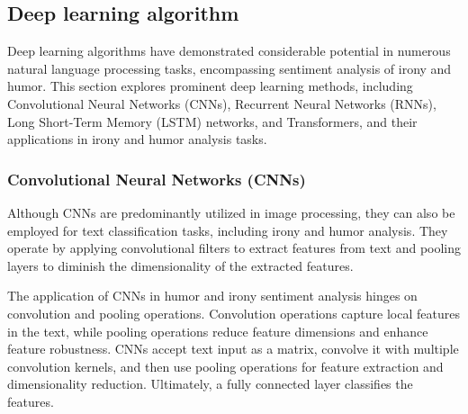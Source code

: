 \documentclass[a4paper]{article}
\begin{document}
\subsection{Deep learning algorithm}

Deep learning algorithms have demonstrated considerable potential in numerous natural language processing tasks, encompassing sentiment analysis of irony and humor. This section explores prominent deep learning methods, including Convolutional Neural Networks (CNNs), Recurrent Neural Networks (RNNs), Long Short-Term Memory (LSTM) networks, and Transformers, and their applications in irony and humor analysis tasks.

\subsubsection{Convolutional Neural Networks (CNNs)}

Although CNNs are predominantly utilized in image processing, they can also be employed for text classification tasks, including irony and humor analysis. They operate by applying convolutional filters to extract features from text and pooling layers to diminish the dimensionality of the extracted features.

The application of CNNs in humor and irony sentiment analysis hinges on convolution and pooling operations. Convolution operations capture local features in the text, while pooling operations reduce feature dimensions and enhance feature robustness. CNNs accept text input as a matrix, convolve it with multiple convolution kernels, and then use pooling operations for feature extraction and dimensionality reduction. Ultimately, a fully connected layer classifies the features.  \cite{ref_cnn2}
\end{document}
